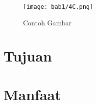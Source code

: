 \begin{figure}[h]
    \centerline{\hbox{\texttt{[image: bab1/4C.png]}}}
    \caption{\label{fig:1.1}Contoh Gambar}
\end{figure}

\section{Tujuan}


\section{Manfaat}


